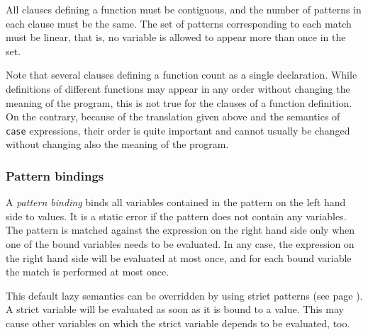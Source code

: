 All clauses defining a function must be contiguous, and the number of patterns in each clause must be the same. The set of patterns corresponding to each match must be linear, that is, no variable is allowed to appear more than once in the set.


Note that several clauses defining a function count as a single  declaration. While definitions of different functions may appear in any order without changing the meaning of the program, this is not true for the clauses of a function definition. On the contrary, because of the translation given above and the semantics of \texttt{case} expressions, their order is quite important and cannot usually be changed without changing also the meaning of the program.

\subsubsection{Pattern bindings} \label{patdef}

A \emph{pattern binding} binds all variables contained in the pattern on the left hand side to values. It is a static error if the pattern does not contain any variables. The pattern is matched against the expression on the right hand side only when one of the bound variables needs to be evaluated. In any case, the expression on the right hand side will be evaluated at most once, and for each bound variable the match is performed at most once.

This default lazy semantics can be overridden by using strict patterns (see page \pageref{strict pattern}). A strict variable will be evaluated as soon as it is bound to a value. This may cause other variables on which the strict variable depends to be evaluated, too.

